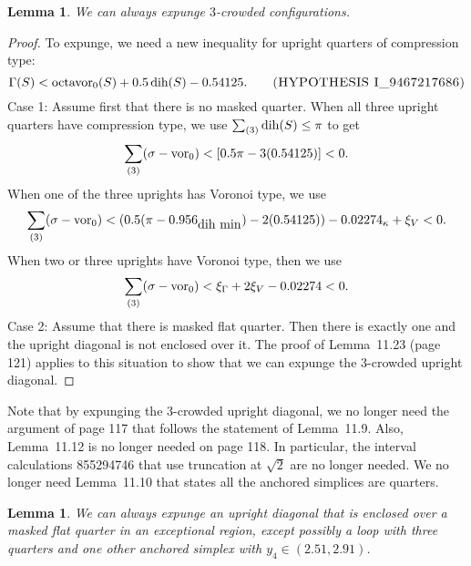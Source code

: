 \documentclass[11pt]{amsart}
\def\op#1{{\text{#1}}}
\def\text{\hbox}
\newtheorem{lemma}[subsubsection]{Lemma}
\begin{document}
\begin{lemma}
{\it We can always expunge $3$-crowded configurations.}  
\end{lemma}

\begin{proof}
To expunge,
we need a new inequality for upright quarters of compression type:
   $$
   \Gamma(S) < \op{octavor}_0(S) + 0.5\,\op{dih}(S) - 0.54125.
   \qquad \text{\sc(HYPOTHESIS I\_9467217686)}
   $$
Case 1: Assume first that there is no masked quarter.
When all three upright quarters have compression type, we use
$\sum_{(3)} \op{dih}(S) \le \pi$ to get
   $$\sum_{(3)}(\sigma-\op{vor}_0) < 
      [0.5\pi - 3 (0.54125)] < 0.$$
When one of the three uprights has Voronoi type, we use
  $$\sum_{(3)}(\sigma - \op{vor}_0 ) <
    (0.5(\pi - 0.956_{\text{dih min}}) - 2(0.54125)) 
    - 0.02274_{\kappa}
    + \xi_V < 0.$$
When two or three uprights have Voronoi type, then we use
   $$\sum_{(3)}(\sigma - \op{vor}_0 ) <
   \xi_\Gamma + 2\xi_V -0.02274 < 0.$$
Case 2: Assume that there is masked flat quarter.  Then there
is exactly one and the upright diagonal is not enclosed over it.
The proof of Lemma~11.23 (page 121) applies to this situation
to show that we can expunge the $3$-crowded upright diagonal.
\end{proof}

Note that by expunging the $3$-crowded upright diagonal, we
no longer need the argument of page 117 that follows the statement of Lemma~11.9.  Also, Lemma~11.12 is no longer needed on page 118.
In particular, the interval calculations 855294746 that use truncation at $\sqrt2$ are no longer needed.  We no longer
need Lemma~11.10 that states all the anchored simplices are
quarters.

\begin{lemma}
We can always expunge an upright diagonal that is enclosed
over a masked flat quarter in an exceptional region, except possibly a loop with three quarters and one other anchored simplex with $y_4\in (2.51,2.91)$.
\end{lemma}
\end{document}
